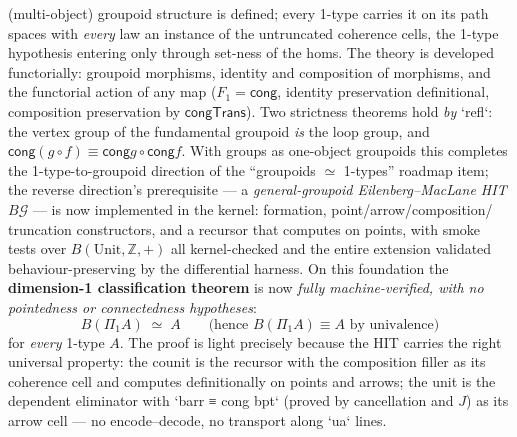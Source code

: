 \documentclass[11pt]{article}
\newcommand{\Z}{\mathbb{Z}}
\newcommand{\op}[1]{\ensuremath{\mathsf{#1}}}
\begin{document}
\begin{itemize}[leftmargin=1.5em]
  (multi-object) groupoid structure is defined; every 1-type carries it
  on its path spaces with \emph{every} law an instance of the
  untruncated coherence cells, the 1-type hypothesis entering only
  through set-ness of the homs.  The theory is developed functorially:
  groupoid morphisms, identity and composition of morphisms, and the
  functorial action of any map ($F_1 = \op{cong}$, identity
  preservation definitional, composition preservation by
  $\op{congTrans}$).  Two strictness theorems hold \emph{by} `refl`:
  the vertex group of the fundamental groupoid \emph{is} the loop group,
  and $\op{cong}(g \circ f) \equiv \op{cong} g \circ \op{cong} f$.
  With groups as one-object groupoids this completes the
  1-type-to-groupoid direction of the ``groupoids $\simeq$ 1-types''
  roadmap item; the reverse direction's prerequisite — a
  \emph{general-groupoid Eilenberg--MacLane HIT} $B\mathcal{G}$ — is
  now implemented in the kernel: formation, point/arrow/composition/
  truncation constructors, and a recursor that computes on points, with
  smoke tests over $B(\mathrm{Unit},\Z,+)$ all kernel-checked and the
  entire extension validated behaviour-preserving by the differential
  harness.  On this foundation the \textbf{dimension-1 classification
  theorem} is now \emph{fully machine-verified, with no pointedness or
  connectedness hypotheses}:
  \[ B(\Pi_1 A) \;\simeq\; A \qquad\text{(hence } B(\Pi_1 A)
     \equiv A\text{ by univalence)} \]
  for \emph{every} 1-type $A$.  The proof is light precisely because the
  HIT carries the right universal property: the counit is the recursor
  with the composition filler as its coherence cell and computes
  definitionally on points and arrows; the unit is the dependent
  eliminator with `barr ≡ cong bpt` (proved by cancellation and $J$) as
  its arrow cell — no encode--decode, no transport along `ua` lines.
\end{itemize}
\end{document}

